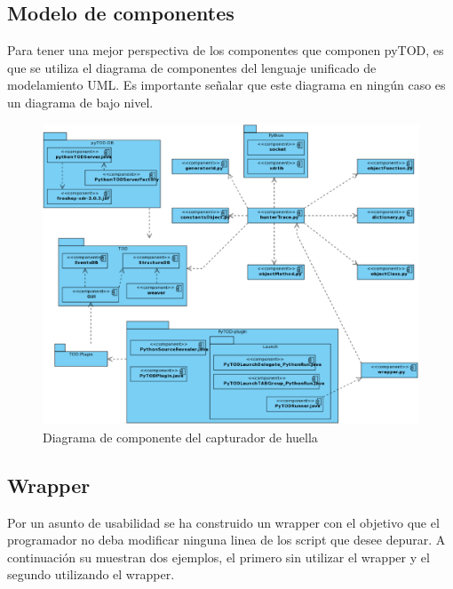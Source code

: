 \documentclass[12pt,legalpaper]{report}
\begin{document}
		\subsection{Modelo de componentes}

Para tener una mejor perspectiva de los componentes que componen pyTOD, es que se utiliza el diagrama de componentes del lenguaje unificado de modelamiento UML.  Es importante señalar que este diagrama en ningún caso es un diagrama de bajo nivel.		
\begin{figure}[hpb]
	\centering
	\includegraphics[scale=0.5]{images/componentModelHunterTrace.eps}
	\caption{Diagrama de componente del capturador de huella}
\end{figure}	
		
		
		\subsection{Wrapper}
		
Por un asunto de usabilidad se ha construido un wrapper con el objetivo que el programador no deba modificar ninguna linea de los script que desee depurar.  A continuación su muestran dos ejemplos, el primero sin utilizar el wrapper y el segundo utilizando el wrapper.
\end{document}
